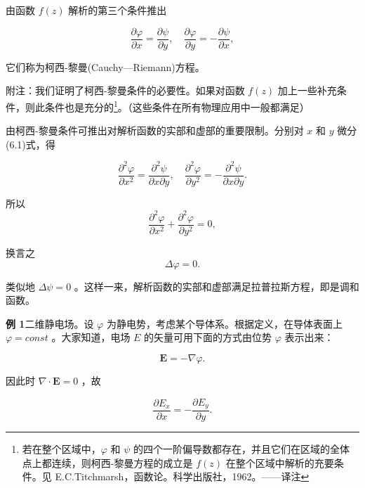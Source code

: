 由函数 $f(z)$ 解析的第三个条件推出

\begin{equation*}
\frac {\partial \varphi}{\partial x} = \frac {\partial \psi}{\partial y}, \quad \frac {\partial \varphi}{\partial y} = - \frac {\partial \psi}{\partial x},\tag{6.1}
\end{equation*}

它们称为柯西-黎曼(Cauchy—Riemann)方程。

附注：我们证明了柯西-黎曼条件的必要性。如果对函数 $f(z)$ 加上一些补充条件，则此条件也是充分的\footnote{若在整个区域中，$\varphi$ 和 $\psi$ 的四个一阶偏导数都存在，并且它们在区域的全体点上都连续，则柯西-黎曼方程的成立是 $f(z)$ 在整个区域中解析的充要条件。见 E.C.Titchmarsh，函数论。科学出版社，1962。——译注}。（这些条件在所有物理应用中一般都满足）

由柯西-黎曼条件可推出对解析函数的实部和虚部的重要限制。分别对 $x$ 和 $y$ 微分(6.1)式，得

\begin{equation*}
\frac {\partial^ {2} \varphi}{\partial x ^ {2}} = \frac {\partial^ {2} \psi}{\partial x \partial y}, \quad \frac {\partial^ {2} \varphi}{\partial y ^ {2}} = - \frac {\partial^ {2} \psi}{\partial x \partial y}.
\end{equation*}

所以
\begin{equation*}
\frac {\partial^ {2} \varphi}{\partial x ^ {2}} + \frac {\partial^ {2} \varphi}{\partial y ^ {2}} = 0,
\end{equation*}

换言之
\begin{equation*}
\Delta \varphi = 0.
\end{equation*}

类似地 $\Delta\psi=0$ 。这样一来，解析函数的实部和虚部满足拉普拉斯方程，即是调和函数。

\textbf{例 1}\quad 二维静电场。设 $\varphi$ 为静电势，考虑某个导体系。根据定义，在导体表面上 $\varphi = const$ 。大家知道，电场 $E$ 的矢量可用下面的方式由位势 $\varphi$ 表示出来：

\begin{equation*}
\boldsymbol {E} = - \nabla \varphi .
\end{equation*}

因此时 $\nabla \cdot \pmb{E} = 0$ ，故

\begin{equation*}
\frac {\partial E _ {x}}{\partial x} = - \frac {\partial E _ {y}}{\partial y}.
\end{equation*}

